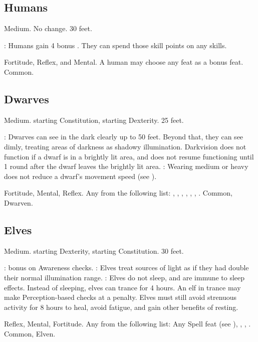 \subsection{Humans}
 Medium.
 No change.
 30 feet.
\begin{itemize}
    : Humans gain 4 bonus . They can spend those skill points on any skills.
\end{itemize}
  Fortitude, Reflex, and Mental.
 A human may choose any feat as a bonus feat.
 Common.

\subsection{Dwarves}
 Medium.
  starting Constitution,  starting Dexterity.
 25 feet.
\begin{itemize}
    : Dwarves can see in the dark clearly up to 50 feet.   Beyond that, they can see dimly, treating areas of darkness as shadowy illumination. Darkvision does not function if a dwarf is in a brightly lit area, and does not resume functioning until 1 round after the dwarf leaves the brightly lit area.
    : Wearing medium or heavy  does not reduce a dwarf's movement speed (see ).
\end{itemize}
  Fortitude,  Mental,  Reflex.
 Any from the following list: , , , , , , .
 Common, Dwarven.

\subsection{Elves}
 Medium.
  starting Dexterity,  starting Constitution.
 30 feet.
\begin{itemize}
    :  bonus on Awareness checks.
    : Elves treat sources of light as if they had double their normal illumination range.
    : Elves do not sleep, and are immune to sleep effects. Instead of sleeping, elves can trance for 4 hours. An elf in trance may make Perception-based checks at a  penalty. Elves must still avoid strenuous activity for 8 hours to heal, avoid fatigue, and gain other benefits of resting.
\end{itemize}
  Reflex,  Mental,  Fortitude.
 Any from the following list: Any Spell feat (see ), , , .
 Common, Elven.

